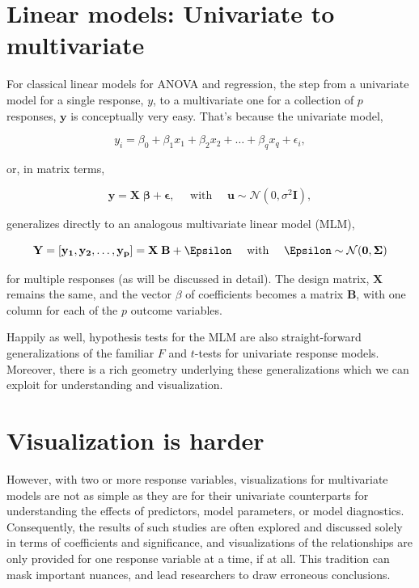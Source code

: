 \documentclass[
  letterpaper,
  10pt,
  krantz2]{krantz}
\begin{document}
\section{Linear models: Univariate to
multivariate}\label{linear-models-univariate-to-multivariate}

For classical linear models for ANOVA and regression, the step from a
univariate model for a single response, \(y\), to a multivariate one for
a collection of \(p\) responses, \(\mathbf{y}\) is conceptually very
easy. That's because the univariate model,

\[y_i = \beta_0 + \beta_1 x_1 + \beta_2 x_2 + \dots + \beta_q x_q + \epsilon_i , \]

or, in matrix terms,

\[\mathbf{y} = \mathbf{X} \; \mathbf{\beta} + \mathbf{\epsilon}, \quad\mbox{   with   }\quad \mathbf{u} \sim \mathcal{N} (0, \sigma^2 \mathbf{I}) ,\]

generalizes directly to an analogous multivariate linear model (MLM),

\[\mathbf{Y} = [\mathbf{y_1}, \mathbf{y_2}, \dots, \mathbf{y_p}] = \mathbf{X} \; \mathbf{B} + \Epsilon \quad\mbox{   with   }\quad \Epsilon \sim \mathcal{N} (\mathbf{0}, \mathbf{\Sigma})\]

for multiple responses (as will be discussed in detail). The design
matrix, \(\mathbf{X}\) remains the same, and the vector \(\beta\) of
coefficients becomes a matrix \(\mathbf{B}\), with one column for each
of the \(p\) outcome variables.

Happily as well, hypothesis tests for the MLM are also straight-forward
generalizations of the familiar \(F\) and \(t\)-tests for univariate
response models. Moreover, there is a rich geometry underlying these
generalizations which we can exploit for understanding and
visualization.

\section{Visualization is harder}\label{visualization-is-harder}

However, with two or more response variables, visualizations for
multivariate models are not as simple as they are for their univariate
counterparts for understanding the effects of predictors, model
parameters, or model diagnostics. Consequently, the results of such
studies are often explored and discussed solely in terms of coefficients
and significance, and visualizations of the relationships are only
provided for one response variable at a time, if at all. This tradition
can mask important nuances, and lead researchers to draw erroneous
conclusions.
\end{document}
